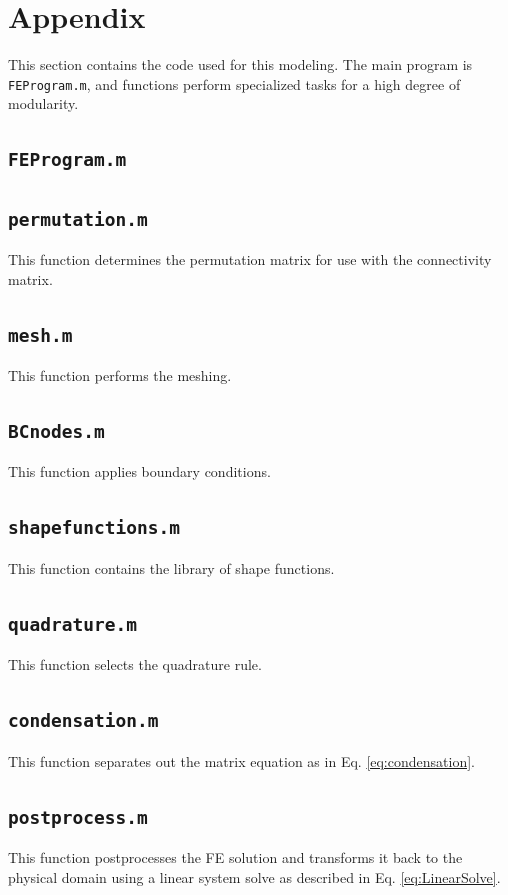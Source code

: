 \documentclass[10pt]{article}
\begin{document}
\section{Appendix}

This section contains the code used for this modeling. The main program is \texttt{FEProgram.m}, and functions perform specialized tasks for a high degree of modularity.

\subsection{\texttt{FEProgram.m}}


\subsection{\texttt{permutation.m}}
This function determines the permutation matrix for use with the connectivity matrix.


\subsection{\texttt{mesh.m}}
This function performs the meshing.


\subsection{\texttt{BCnodes.m}}
This function applies boundary conditions.


\subsection{\texttt{shapefunctions.m}}
This function contains the library of shape functions.


\subsection{\texttt{quadrature.m}}
This function selects the quadrature rule.


\subsection{\texttt{condensation.m}}
This function separates out the matrix equation as in Eq. \eqref{eq:condensation}.


\subsection{\texttt{postprocess.m}}
This function postprocesses the FE solution and transforms it back to the physical domain using a linear system solve as described in Eq. \eqref{eq:LinearSolve}.

\end{document}
